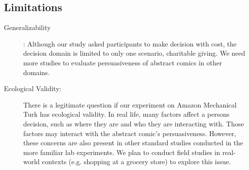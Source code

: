 \subsection{Limitations}
\begin{description}
 \item[Generalizability]:  Although our study asked participants to make decision with cost, the decision domain is limited to only one scenario, charitable giving. We need more studies to evaluate persuasiveness of abstract comics in other domains.

 \item[Ecological Validity:] There is a legitimate question if our experiment on Amazon Mechanical Turk has ecological validity.  In real life, many factors  affect a persons decision, such as where they are and who they are interacting with. Those factors may interact with the abstract comic's persuasiveness. However, these concerns are also present in other standard studies conducted in the more familiar lab experiments. We plan to conduct field studies in real-world contexts (e.g. shopping at a grocery store) to explore this issue.
 

\end{description}
